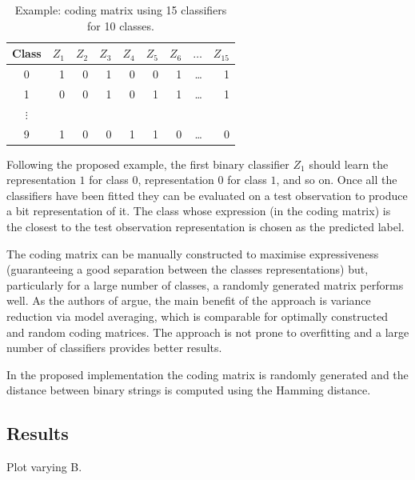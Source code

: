 \documentclass[12pt]{article}
\begin{document}
	\begin{table}[H] 
		\centering
		\caption*{Example: coding matrix using 15 classifiers for 10 classes.}
		\begin{tabular}{crrrrrrrr}
			\toprule
      Class & \( Z_1 \) & \( Z_2 \) & \( Z_3 \) & \( Z_4 \) & \( Z_5 \) & \( Z_6 \) & \( \dots \) & \( Z_{15} \) \\
      \midrule
      0 & 1 & 0 & 1 & 0 & 0 & 1 & \dots & 1 \\
      1 & 0 & 0 & 1 & 0 & 1 & 1 & \dots & 1 \\
      \( \vdots \) & & & & &  & & & \\
      9 & 1 & 0 & 0 & 1 & 1 & 0 &\dots & 0 \\
			\bottomrule
		\end{tabular}
	\end{table}

  Following the proposed example, the first binary classifier \( Z_1 \) should learn the representation \( 1 \) for class \( 0 \), representation \( 0 \) for class \( 1 \), and so on. Once all the classifiers have been fitted they can be evaluated on a test observation to produce a bit representation of it. The class whose expression (in the coding matrix) is the closest to the test observation representation is chosen as the predicted label.

  The coding matrix can be manually constructed to maximise expressiveness (guaranteeing a good separation between the classes representations) but, particularly for a large number of classes, a randomly generated matrix performs well. As the authors of \cite{james1998error} argue, the main benefit of the approach is variance reduction via model averaging, which is comparable for optimally constructed and random coding matrices. The approach is not prone to overfitting and a large number of classifiers provides better results.

  In the proposed implementation the coding matrix is randomly generated and the distance between binary strings is computed using the Hamming distance.


  \subsection*{Results}

  Plot varying B.
\end{document}
